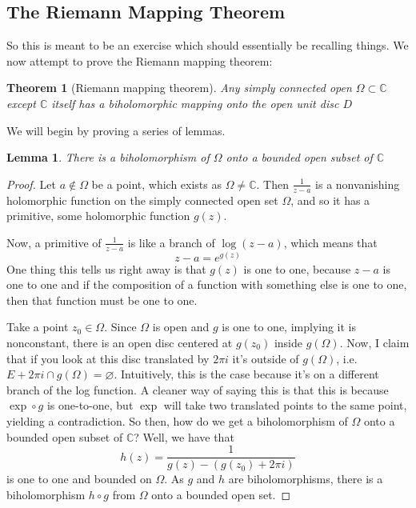 \documentclass{article}
\newtheorem{theorem}{Theorem}
\newtheorem{lemma}{Lemma}
\newcommand{\mbb}[1]{\mathbb{#1}}
\begin{document}
\subsection{The Riemann Mapping Theorem}

So this is meant to be an exercise which should essentially be recalling things. We now attempt to prove the Riemann mapping theorem:
\begin{theorem}[Riemann mapping theorem]
Any simply connected open \(\Omega \subset \mbb{C}\) except \(\mbb{C}\) itself has a biholomorphic mapping onto the open unit disc \(D\)
\end{theorem}
We will begin by proving a series of lemmas.
\begin{lemma}
There is a biholomorphism of \(\Omega\) onto a bounded open subset of \(\mbb{C}\)
\end{lemma}
\begin{proof}
Let \(a \notin \Omega\) be a point, which exists as \(\Omega \neq \mbb{C}\). Then \(\frac{1}{z - a}\) is a nonvanishing holomorphic function on the simply connected open set \(\Omega\), and so it has a primitive, some holomorphic function \(g(z)\).

Now, a primitive of \(\frac{1}{z - a}\) is like a branch of \(\log(z - a)\), which means that
\begin{equation}z - a = e^{g(z)}\end{equation}
One thing this tells us right away is that \(g(z)\) is one to one, because \(z - a\) is one to one and if the composition of a function with something else is one to one, then that function must be one to one.

Take a point \(z_0 \in \Omega\). Since \(\Omega\) is open and \(g\) is one to one, implying it is nonconstant, there is an open disc centered at \(g(z_0)\) inside \(g(\Omega)\). Now, I claim that if you look at this disc translated by \(2\pi i\) it's outside of \(g(\Omega)\), i.e. \(E + 2\pi i \cap g(\Omega) = \varnothing\). Intuitively, this is the case because it's on a different branch of the log function. A cleaner way of saying this is that this is because \(\exp \circ g\) is one-to-one, but \(\exp\) will take two translated points to the same point, yielding a contradiction.
So then, how do we get a biholomorphism of \(\Omega\) onto a bounded open subset of \(\mbb{C}\)? Well, we have that
\begin{equation}h(z) = \frac{1}{g(z) - (g(z_0) + 2\pi i)}\end{equation}
is one to one and bounded on \(\Omega\). As \(g\) and \(h\) are biholomorphisms, there is a biholomorphism \(h \circ g\) from \(\Omega\) onto a bounded open set.
\end{proof}
\end{document}
